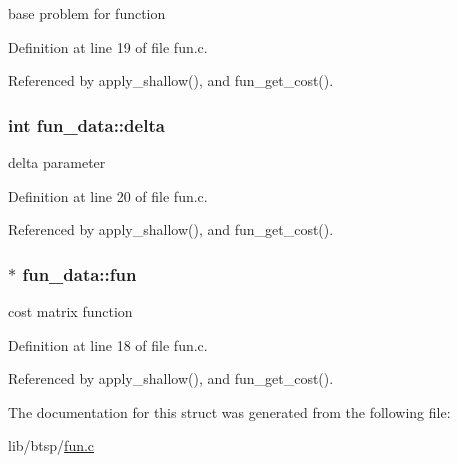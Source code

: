 base problem for function 

Definition at line 19 of file fun.c.

Referenced by apply\_\-shallow(), and fun\_\-get\_\-cost().\hypertarget{structfun__data_1d0479ab1ce43aa65ba7cac44874d414}{
\subsubsection[{delta}]{\setlength{\rightskip}{0pt plus 5cm}int {\bf fun\_\-data::delta}}}
\label{structfun__data_1d0479ab1ce43aa65ba7cac44874d414}


delta parameter 

Definition at line 20 of file fun.c.

Referenced by apply\_\-shallow(), and fun\_\-get\_\-cost().\hypertarget{structfun__data_a4103cadf3d844dc528d9e02884cfc98}{
\subsubsection[{fun}]{$\ast$ {\bf fun\_\-data::fun}}}
\label{structfun__data_a4103cadf3d844dc528d9e02884cfc98}


cost matrix function 

Definition at line 18 of file fun.c.

Referenced by apply\_\-shallow(), and fun\_\-get\_\-cost().

The documentation for this struct was generated from the following file:\begin{CompactItemize}
\item 
lib/btsp/\hyperlink{fun_8c}{fun.c}\end{CompactItemize}
